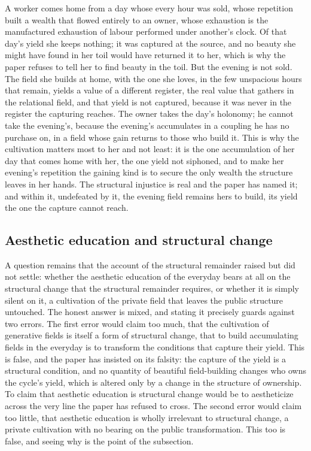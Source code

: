 \begin{casebox}
A worker comes home from a day whose every hour was sold, whose repetition built a wealth that flowed entirely to an owner, whose exhaustion is the manufactured exhaustion of labour performed under another's clock. Of that day's yield she keeps nothing; it was captured at the source, and no beauty she might have found in her toil would have returned it to her, which is why the paper refuses to tell her to find beauty in the toil. But the evening is not sold. The field she builds at home, with the one she loves, in the few unspacious hours that remain, yields a value of a different register, the real value that gathers in the relational field, and that yield is not captured, because it was never in the register the capturing reaches. The owner takes the day's holonomy; he cannot take the evening's, because the evening's accumulates in a coupling he has no purchase on, in a field whose gain returns to those who build it. This is why the cultivation matters most to her and not least: it is the one accumulation of her day that comes home with her, the one yield not siphoned, and to make her evening's repetition the gaining kind is to secure the only wealth the structure leaves in her hands. The structural injustice is real and the paper has named it; and within it, undefeated by it, the evening field remains hers to build, its yield the one the capture cannot reach.
\end{casebox}

\subsection{Aesthetic education and structural change}
\label{p22:sub:pe-structural-change}

A question remains that the account of the structural remainder raised but did not settle: whether the aesthetic education of the everyday bears at all on the structural change that the structural remainder requires, or whether it is simply silent on it, a cultivation of the private field that leaves the public structure untouched. The honest answer is mixed, and stating it precisely guards against two errors. The first error would claim too much, that the cultivation of generative fields is itself a form of structural change, that to build accumulating fields in the everyday is to transform the conditions that capture their yield. This is false, and the paper has insisted on its falsity: the capture of the yield is a structural condition, and no quantity of beautiful field-building changes who owns the cycle's yield, which is altered only by a change in the structure of ownership. To claim that aesthetic education is structural change would be to aestheticize across the very line the paper has refused to cross. The second error would claim too little, that aesthetic education is wholly irrelevant to structural change, a private cultivation with no bearing on the public transformation. This too is false, and seeing why is the point of the subsection.

